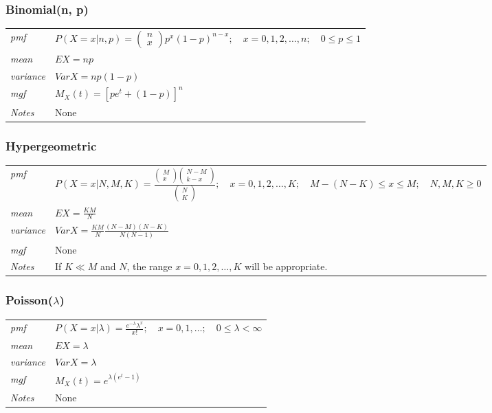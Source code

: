 \documentclass[12pt]{article}
\begin{document}
\subsubsection*{Binomial(n, p) \cite[p. 621]{StatisticalInference}}
\begin{tabularx}{\textwidth}{ l X }
\emph{pmf} & $P(X=x|n, p)=\begin{pmatrix}
n \\
x
\end{pmatrix}p^x(1-p)^{n-x}; \quad x=0, 1, 2, \dots, n; \quad 0 \leq p \leq 1$ \\
\emph{mean} & $EX=np$ \\
\emph{variance} & $Var X =np(1-p)$ \\
\emph{mgf} & $M_X(t)=[pe^t + (1-p)]^n$ \\
\emph{Notes} & None\\
\end{tabularx}

\subsubsection*{Hypergeometric \cite[p. 622]{StatisticalInference}}
\begin{tabularx}{\textwidth}{ l X }
\emph{pmf} & $P(X=x|N, M, K)=\frac{
\begin{pmatrix}
M \\
x
\end{pmatrix}
\begin{pmatrix}
N - M \\
k - x
\end{pmatrix}
}{
\begin{pmatrix}
N \\
K
\end{pmatrix}}; \quad x=0, 1, 2, \dots, K; \quad M - (N - K) \leq x \leq M; \quad N, M, K \geq 0$ \\
\emph{mean} & $EX=\frac{KM}{N}$ \\
\emph{variance} & $Var X = \frac{KM}{N} \frac{(N-M)(N-K)}{N(N-1)}$ \\
\emph{mgf} & None \\
\emph{Notes} & If $K \ll M$ and $N$, the range $x=0, 1, 2, \dots, K$ will be appropriate.\\
\end{tabularx}

\subsubsection*{Poisson($\lambda$) \cite[p. 622]{StatisticalInference}}
\begin{tabularx}{\textwidth}{ l X }
\emph{pmf} & $P(X=x|\lambda)=\frac{e^{-\lambda}\lambda^x}{x!}; \quad x=0, 1, \dots; \quad 0 \leq \lambda <\infty$ \\
\emph{mean} & $EX=\lambda$ \\
\emph{variance} & $Var X =\lambda$ \\
\emph{mgf} & $M_X(t)=e^{\lambda(e^t-1)}$ \\
\emph{Notes} & None\\
\end{tabularx}
\end{document}
